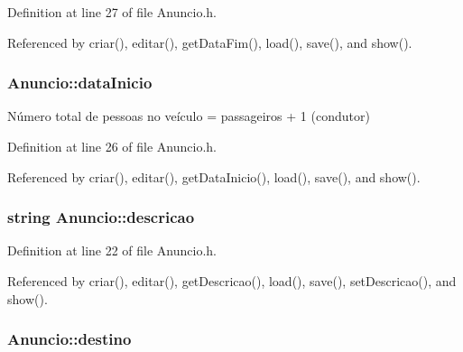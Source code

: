 Definition at line 27 of file Anuncio.\+h.



Referenced by criar(), editar(), get\+Data\+Fim(), load(), save(), and show().

\hypertarget{class_anuncio_abeb7d8c5fe5e7d127005044981a3cd3d}{
\subsubsection[{data\+Inicio}]{ Anuncio\+::data\+Inicio\hspace{0.3cm}{\ttfamily [protected]}}}\label{class_anuncio_abeb7d8c5fe5e7d127005044981a3cd3d}


Número total de pessoas no veículo = passageiros + 1 (condutor) 



Definition at line 26 of file Anuncio.\+h.



Referenced by criar(), editar(), get\+Data\+Inicio(), load(), save(), and show().

\hypertarget{class_anuncio_aa6a9eb8d08cb06d16061b006eb2c8b97}{
\subsubsection[{descricao}]{\setlength{\rightskip}{0pt plus 5cm}string Anuncio\+::descricao\hspace{0.3cm}{\ttfamily [protected]}}}\label{class_anuncio_aa6a9eb8d08cb06d16061b006eb2c8b97}


Definition at line 22 of file Anuncio.\+h.



Referenced by criar(), editar(), get\+Descricao(), load(), save(), set\+Descricao(), and show().

\hypertarget{class_anuncio_acdac86595f84cfb8a2bf54c414857168}{
\subsubsection[{destino}]{ Anuncio\+::destino\hspace{0.3cm}{\ttfamily [protected]}}}\label{class_anuncio_acdac86595f84cfb8a2bf54c414857168}


